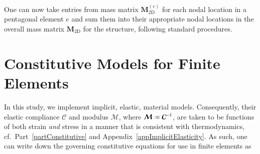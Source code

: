 One can now take entries from mass matrix $\mathbf{M}^{(e)}_{\mathrm{2D}}$ for each nodal location in a pentagonal element $e$ and sum them into their appropriate nodal locations in the overall mass matrix $\mathbf{M}_{\mathrm{2D}}$ for the structure, following standard procedures. \cite{ClaytonChung18}


\section{Constitutive Models for Finite Elements}


In this study, we implement implicit, elastic, material models.  Consequently, their elastic compliance $\boldsymbol{\mathcal{C}}$ and modulus $\boldsymbol{\mathcal{M}}$, where $\boldsymbol{\mathcal{M}} \defeq \boldsymbol{\mathcal{C}}^{-1}$, are taken to be functions of both strain \textit{and\/} stress in a manner that is consistent with thermo\-dynamics, cf.\ Part~\ref{partConstitutive} and Appendix~\ref{appImplicitElasticity}.  As such, one can write down the governing constitutive equations for use in finite elements as
